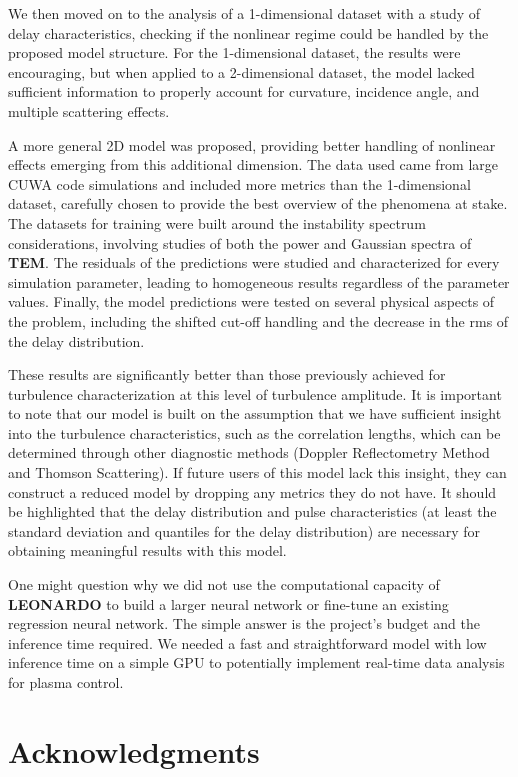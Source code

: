 \documentclass[11pt,openany]{report}
\begin{document}
\begin{multicols}{2}
    We then moved on to the analysis of a 1-dimensional dataset with a study of delay characteristics, checking if the nonlinear regime could be handled by the proposed model structure. For the 1-dimensional dataset, the results were encouraging, but when applied to a 2-dimensional dataset, the model lacked sufficient information to properly account for curvature, incidence angle, and multiple scattering effects.

    A more general 2D model was proposed, providing better handling of nonlinear effects emerging from this additional dimension. The data used came from large CUWA code simulations and included more metrics than the 1-dimensional dataset, carefully chosen to provide the best overview of the phenomena at stake. The datasets for training were built around the instability spectrum considerations, involving studies of both the power and Gaussian spectra of \textbf{TEM}. The residuals of the predictions were studied and characterized for every simulation parameter, leading to homogeneous results regardless of the parameter values. Finally, the model predictions were tested on several physical aspects of the problem, including the shifted cut-off handling and the decrease in the rms of the delay distribution.

    These results are significantly better than those previously achieved for turbulence characterization at this level of turbulence amplitude. It is important to note that our model is built on the assumption that we have sufficient insight into the turbulence characteristics, such as the correlation lengths, which can be determined through other diagnostic methods (Doppler Reflectometry Method and Thomson Scattering). If future users of this model lack this insight, they can construct a reduced model by dropping any metrics they do not have. It should be highlighted that the delay distribution and pulse characteristics (at least the standard deviation and quantiles for the delay distribution) are necessary for obtaining meaningful results with this model.

    One might question why we did not use the computational capacity of \textbf{LEONARDO} to build a larger neural network or fine-tune an existing regression neural network. The simple answer is the project's budget and the inference time required. We needed a fast and straightforward model with low inference time on a simple GPU to potentially implement real-time data analysis for plasma control.

    \chapter*{Acknowledgments}


\end{multicols}
\end{document}

